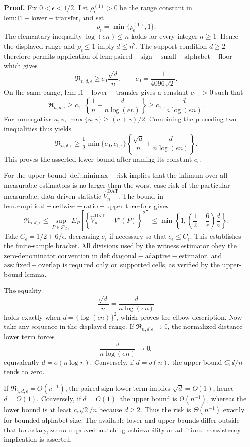 \textbf{Proof.}
Fix \(0<\epsilon<1/2\).  Let \(\rho_\epsilon^{(1)}>0\) be the range constant in \(\mathrm{lem:l1-lower-transfer}\), and set
\[
 \rho_\epsilon=\min\{\rho_\epsilon^{(1)},1\}.
\]
The elementary inequality \(\log(en)\le n\) holds for every integer \(n\ge1\).  Hence the displayed range and \(\rho_\epsilon\le1\) imply \(d\le n^2\).  The support condition \(d\ge2\) therefore permits application of \(\mathrm{lem:paired-sign-small-alphabet-floor}\), which gives
\[
 \mathfrak R_{n,d,\epsilon}
 \ge c_0\frac{\sqrt d}{n},
 \qquad c_0=\frac1{4096\sqrt2}.
\]
On the same range, \(\mathrm{lem:l1-lower-transfer}\) gives a constant \(c_{1,\epsilon}>0\) such that
\[
 \mathfrak R_{n,d,\epsilon}
 \ge c_{1,\epsilon}\left\{\frac1n+
       \frac d{n\log(en)}\right\}
 \ge c_{1,\epsilon}\frac d{n\log(en)}.
\]
For nonnegative \(u,v\), \(\max\{u,v\}\ge(u+v)/2\).  Combining the preceding two inequalities thus yields
\[
 \mathfrak R_{n,d,\epsilon}
 \ge \frac12\min\{c_0,c_{1,\epsilon}\}
 \left\{\frac{\sqrt d}{n}+
       \frac d{n\log(en)}\right\}.
\]
This proves the asserted lower bound after naming its constant \(c_\epsilon\).

For the upper bound, \(\mathrm{def:minimax-risk}\) implies that the infimum over all measurable estimators is no larger than the worst-case risk of the particular measurable, data-driven statistic \(\widehat V_n^{\mathrm{DAT}}\).  The bound in \(\mathrm{lem:empirical-cellwise-ratio-upper}\) therefore gives
\[
 \mathfrak R_{n,d,\epsilon}
 \le \sup_{P\in\mathcal P_{d,\epsilon}}
 E_P\!\left[
  \left\{\widehat V_n^{\mathrm{DAT}}-V^\star(P)\right\}^2
 \right]
 \le \min\!\left\{1,
   \left(\frac12+\frac6\epsilon\right)\frac dn
 \right\}.
\]
Take \(C_\epsilon=1/2+6/\epsilon\), decreasing \(c_\epsilon\) if necessary so that \(c_\epsilon\le C_\epsilon\).  This establishes the finite-sample bracket.  All divisions used by the witness estimator obey the zero-denominator convention in \(\mathrm{def:diagonal-adaptive-estimator}\), and \(\mathrm{ass:fixed-overlap}\) is required only on supported cells, as verified by the upper-bound lemma.

The equality
\[
 \frac{\sqrt d}{n}=\frac d{n\log(en)}
\]
holds exactly when \(d=\{\log(en)\}^2\), which proves the elbow description.  Now take any sequence in the displayed range.  If \(\mathfrak R_{n,d,\epsilon}\to0\), the normalized-distance lower term forces
\[
 \frac d{n\log(en)}\longrightarrow0,
\]
equivalently \(d=o(n\log n)\).  Conversely, if \(d=o(n)\), the upper bound \(C_\epsilon d/n\) tends to zero.

If \(\mathfrak R_{n,d,\epsilon}=O(n^{-1})\), the paired-sign lower term implies \(\sqrt d=O(1)\), hence \(d=O(1)\).  Conversely, if \(d=O(1)\), the upper bound is \(O(n^{-1})\), whereas the lower bound is at least \(c_\epsilon\sqrt2/n\) because \(d\ge2\).  Thus the risk is \(\Theta(n^{-1})\) exactly for bounded alphabet size.  The available lower and upper bounds differ outside that boundary, so no unproved matching achievability or additional consistency implication is asserted.